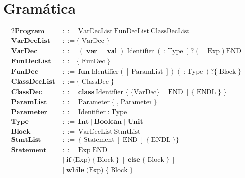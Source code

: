 \documentclass[a4paper,10pt]{article}
\begin{document}
\section*{Gramática}

\begin{alignat*}{2}
\textbf{Program}
  \;&::=  \; \text{VarDecList} 
    \; \text{FunDecList} 
    \;\text{ClassDecList}  \\[3pt]
\textbf{VarDecList}
\;&::= \{ \; \text{VarDec}\; \} \\[3pt]
\textbf{VarDec}
  \;&::=\; (\;\textbf{var}\;\mid\;\textbf{val}\;)\;\text{Identifier}
     \;(\;\textbf{:}\;\text{Type}\;)?
     \; \text{(} \; \textbf{=}\;\text{Exp} \; \text{)} \;\text{END} \\[3pt]
\textbf{FunDecList}
\;&::= \{ \; \text{FunDec}\; \} \\[3pt]
\textbf{FunDec}
  \;&::=\; \textbf{fun}\;\text{Identifier}
     \;\textbf{(}\;[\;\text{ParamList}\;]\;\textbf{)}
     \;(\;\textbf{:}\;\text{Type}\;)?
     \{ \;\text{Block}\; \} \\[3pt]
\textbf{ClassDecList}
\;&::= \{ \; \text{ClassDec}\; \} \\[3pt]
\textbf{ClassDec}
  \;&::=\; \textbf{class}\;\text{Identifier}
     \;\textbf{\{}\;\text{\{VarDec\}}\;[\;\text{END}\;]\;\{\;\text{ENDL}\;\}\;\textbf{\}} \\[3pt]
\textbf{ParamList}
  \;&::=\; \text{Parameter} \; \{ \; \textbf{,} \; \text{Parameter} \;\} \\[3pt]
\textbf{Parameter}
  \;&::=\; \text{Identifier}\;\textbf{:}\;\text{Type} \\[3pt]
\textbf{Type}
  \;&::=\; \textbf{Int}
   \;|\;\textbf{Boolean}
   \;|\;\textbf{Unit} \\[3pt]
\textbf{Block}
  \;&::=\; \text{VarDecList}  \; \text{StmtList} \; \\[3pt]
\textbf{StmtList}
  \;&::=\; \{\;\text{Statement}\;[\;\text{END}\;]\;\{\;\text{ENDL}\;\}\} \\[3pt]
\textbf{Statement}
\;&::=\;  \text{Exp}\;\text{END} \\
  \;&\mid\; \textbf{if}\;\textbf{(} \text{Exp} \textbf{)}\; \{ \; \text{Block} \; \}
     \;[\;\textbf{else} \; \{  \;\text{Block} \; \} \;] \\[3pt]
  \;&\mid\; \textbf{while}\;\textbf{(} \text{Exp} \textbf{)}\; \{ \; \text{Block}\; \} \\[3pt]

\end{alignat*}
\end{document}
